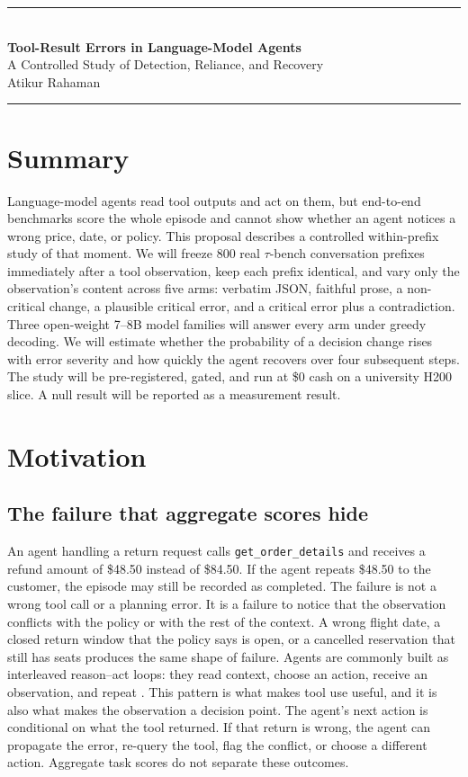 \documentclass[11pt,a4paper]{article}
\begin{document}
\begin{center}
{\color{navy}\rule{\textwidth}{1.2pt}}\\[0.7em]
{\LARGE\bfseries Tool-Result Errors in Language-Model Agents}\\[0.55em]
{\large A Controlled Study of Detection, Reliance, and Recovery}\\[0.9em]
{\normalsize Atikur Rahaman}\\[0.5em]
{\color{navy}\rule{\textwidth}{0.6pt}}
\end{center}

\section{Summary}
Language-model agents read tool outputs and act on them, but end-to-end benchmarks score the
whole episode and cannot show whether an agent notices a wrong price, date, or policy. This
proposal describes a controlled within-prefix study of that moment. We will freeze 800 real
$\tau$-bench conversation prefixes immediately after a tool observation, keep each prefix
identical, and vary only the observation's content across five arms: verbatim JSON, faithful
prose, a non-critical change, a plausible critical error, and a critical error plus a
contradiction. Three open-weight 7--8B model families will answer every arm under greedy decoding.
We will estimate whether the probability of a decision change rises with error severity and how
quickly the agent recovers over four subsequent steps. The study will be pre-registered, gated, and
run at \$0 cash on a university H200 slice. A null result will be reported as a measurement result.

\section{Motivation}

\subsection{The failure that aggregate scores hide}
An agent handling a return request calls \texttt{get\_order\_details} and receives a refund amount
of \$48.50 instead of \$84.50. If the agent repeats \$48.50 to the customer, the episode may still
be recorded as completed. The failure is not a wrong tool call or a planning error. It is a failure
to notice that the observation conflicts with the policy or with the rest of the context. A wrong
flight date, a closed return window that the policy says is open, or a cancelled reservation that
still has seats produces the same shape of failure. Agents are commonly built as interleaved
reason--act loops: they read context, choose an action,
receive an observation, and repeat \cite{react}. This pattern is what makes tool use useful, and it
is also what makes the observation a decision point. The agent's next action is conditional on what
the tool returned. If that return is wrong, the agent can propagate the error, re-query the tool,
flag the conflict, or choose a different action. Aggregate task scores do not separate these
outcomes.
\end{document}
